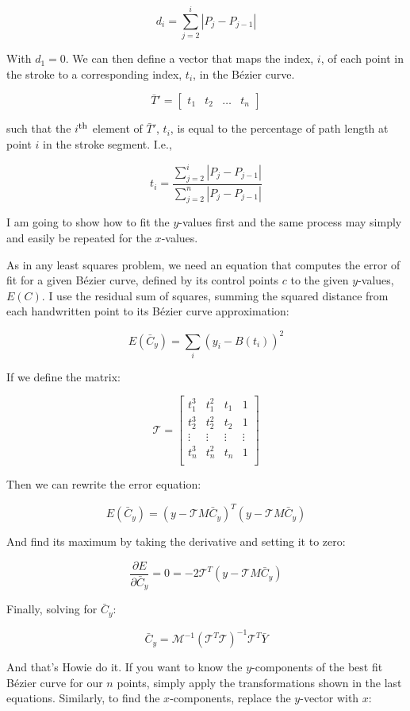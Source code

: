 \documentclass{article}
\newcommand{\Ith}{\ensuremath{i^\textrm{\footnotesize th}}}
\begin{document}
\[d_i=\sum_{j=2}^{i}|P_j-P_{j-1}|\]

With $d_1=0$.  We can then define a vector that maps the index, $i$, of each point in the stroke to a corresponding index, $t_i$, in the B\'ezier curve.

\[\bar{T}'=[\begin{array}{cccc} t_1 & t_2 & \ldots & t_n \end{array}]\]

such that the $\Ith$ element of $\bar{T}'$, $t_i$, is equal to the percentage of path length at point $i$ in the stroke segment.  I.e.,

\[t_i=\frac{\sum_{j=2}^{i}|P_j-P_{j-1}|}{\sum_{j=2}^{n}|P_j-P_{j-1}|}\]

I am going to show how to fit the $y$-values first and the same process may simply and easily be repeated for the $x$-values.

As in any least squares problem, we need an equation that computes the error of fit for a given B\'ezier curve, defined by its control points $c$ to the given $y$-values, $E(C)$. I use the residual sum of squares, summing the squared distance from each handwritten point to its B\'ezier curve approximation:

\[E(\bar{C}_y)=\sum_i(y_i-B(t_i))^2\]

If we define the matrix:

\[\mathcal{T}=\left[\begin{array}{rrrr}
       t_1^3 &  t_1^2 &  t_1   &      1 \\
       t_2^3 &  t_2^2 &  t_2   &      1 \\
      \vdots & \vdots & \vdots & \vdots \\
       t_n^3 &  t_n^2 &  t_n   &      1 \\
\end{array}\right]\]

Then we can rewrite the error equation:

\[E(\bar{C}_y)=(y-\mathcal{T}M\bar{C}_y)^T(y-\mathcal{T}M\bar{C}_y)\]

And find its maximum by taking the derivative and setting it to zero:

\[\frac{\partial E}{\partial \bar{C}_y} = 0 = -2\mathcal{T}^T(y-\mathcal{T}M\bar{C}_y)\]

Finally, solving for $\bar{C}_y$:

\[\bar{C}_y = \mathcal{M}^{-1}(\mathcal{T}^T\mathcal{T})^{-1}\mathcal{T}^T\bar{Y}\]

And that's Howie do it.  If you want to know the $y$-components of the best fit B\'ezier curve for our $n$ points, simply apply the transformations shown in the last equations. Similarly, to find the $x$-components, replace the $y$-vector with $x$:
\end{document}

